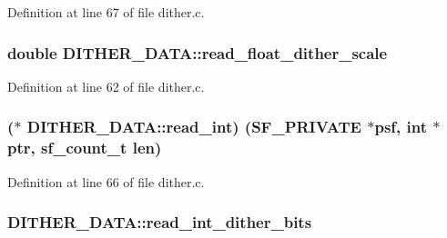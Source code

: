 Definition at line 67 of file dither.\+c.

\subsubsection[{\texorpdfstring{read\+\_\+float\+\_\+dither\+\_\+scale}{read_float_dither_scale}}]{\setlength{\rightskip}{0pt plus 5cm}double D\+I\+T\+H\+E\+R\+\_\+\+D\+A\+T\+A\+::read\+\_\+float\+\_\+dither\+\_\+scale}\hypertarget{struct_d_i_t_h_e_r___d_a_t_a_a7f0a332cf7214922c411ebc46d4c1edf}{}\label{struct_d_i_t_h_e_r___d_a_t_a_a7f0a332cf7214922c411ebc46d4c1edf}


Definition at line 62 of file dither.\+c.

\subsubsection[{\texorpdfstring{read\+\_\+int}{read_int}}]{($\ast$ D\+I\+T\+H\+E\+R\+\_\+\+D\+A\+T\+A\+::read\+\_\+int) ({\bf S\+F\+\_\+\+P\+R\+I\+V\+A\+TE} $\ast$psf, {\bf int} $\ast$ptr, {\bf sf\+\_\+count\+\_\+t} {\bf len})}\hypertarget{struct_d_i_t_h_e_r___d_a_t_a_a7fe818f56ae94bc5060c95fe6c7160f4}{}\label{struct_d_i_t_h_e_r___d_a_t_a_a7fe818f56ae94bc5060c95fe6c7160f4}


Definition at line 66 of file dither.\+c.

\subsubsection[{\texorpdfstring{read\+\_\+int\+\_\+dither\+\_\+bits}{read_int_dither_bits}}]{ D\+I\+T\+H\+E\+R\+\_\+\+D\+A\+T\+A\+::read\+\_\+int\+\_\+dither\+\_\+bits}\hypertarget{struct_d_i_t_h_e_r___d_a_t_a_a30eac9624a3aaeebfdb166fead4abb6c}{}\label{struct_d_i_t_h_e_r___d_a_t_a_a30eac9624a3aaeebfdb166fead4abb6c}


